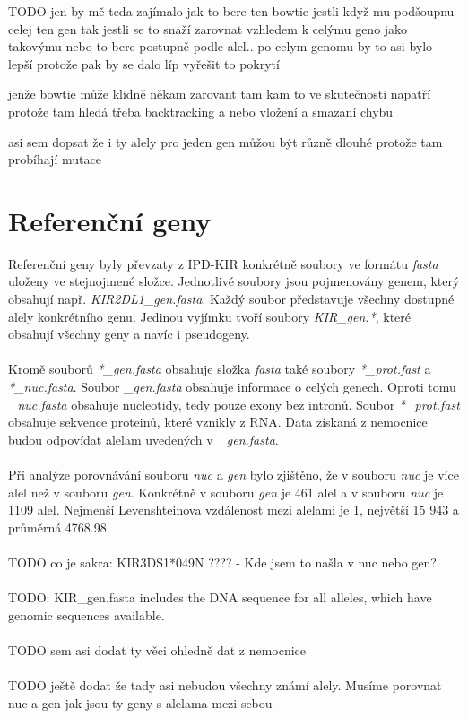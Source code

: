 \documentclass[czech,DP]{thesiskiv}
\numberwithin{equation}{section}
\begin{document}
TODO jen by mě teda zajímalo jak to bere ten bowtie jestli když mu podšoupnu celej ten gen tak jestli se to snaží zarovnat vzhledem k celýmu geno jako takovýmu nebo to bere postupně podle alel.. 
po celym genomu by to asi bylo lepší protože pak by se dalo líp vyřešit to pokrytí 

jenže bowtie může klidně někam zarovant tam kam to ve skutečnosti napatří protože tam hledá třeba backtracking a nebo vložení a smazaní chybu


asi sem dopsat že i ty alely pro jeden gen můžou být různě dlouhé protože tam probíhají mutace

\section{Referenční geny}
Referenční geny byly převzaty z IPD-KIR \cite{imgt_hla_database} konkrétně soubory ve formátu \textit{fasta} uloženy ve stejnojmené složce. Jednotlivé soubory jsou pojmenovány genem, který obsahují např. \textit{KIR2DL1\_gen.fasta}. Každý soubor představuje všechny dostupné alely konkrétního genu. Jedinou vyjímku tvoří soubory \textit{KIR\_gen.*}, které obsahují všechny geny a navíc i pseudogeny. 
\\
\\
Kromě souborů \textit{*\_gen.fasta} obsahuje složka \textit{fasta} také soubory \textit{*\_prot.fast} a \textit{*\_nuc.fasta}. Soubor \textit{\_gen.fasta} obsahuje informace o celých genech. Oproti tomu \textit{\_nuc.fasta} obsahuje nucleotidy, tedy pouze exony bez intronů. Soubor \textit{*\_prot.fast} obsahuje sekvence proteinů, které vznikly z RNA. Data získaná z nemocnice budou odpovídat alelam uvedených v \textit{\_gen.fasta}. 
\\
\\
Při analýze porovnávání souboru \textit{nuc} a \textit{gen} bylo zjištěno, že v souboru \textit{nuc} je více alel než v souboru \textit{gen}. Konkrétně v souboru \textit{gen} je 461 alel a v souboru \textit{nuc} je 1109 alel. Nejmenší Levenshteinova vzdálenost mezi alelami je 1, největší 15 943 a průměrná 4768.98.
\\
\\
TODO co je sakra:  KIR3DS1*049N ???? - Kde jsem to našla v nuc nebo gen?
\\
\\
TODO: KIR\_gen.fasta  includes the DNA sequence for all alleles, which have genomic sequences available.
\\
\\
TODO sem asi dodat ty věci ohledně dat z nemocnice
\\
\\
TODO ještě dodat že tady asi nebudou všechny známí alely.
Musíme porovnat nuc a gen jak jsou ty geny s alelama mezi sebou
\end{document}

